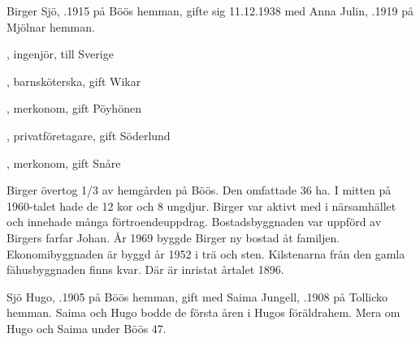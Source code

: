 Birger Sjö, .1915 på Böös hemman, gifte sig 11.12.1938 med Anna Julin, .1919 på Mjölnar hemman.
\begin{jhchildren}
  \item {}, ingenjör, till Sverige
  \item {}, barnsköterska, gift Wikar
  \item {}, merkonom, gift Pöyhönen
  \item {}, privatföretagare, gift Söderlund
  \item {}, merkonom, gift Snåre
\end{jhchildren}

Birger övertog 1/3 av hemgården på Böös. Den omfattade 36 ha. I mitten på 1960-talet hade de 12 kor och 8 ungdjur. Birger var aktivt med i närsamhället och innehade många förtroendeuppdrag. Bostadsbyggnaden var uppförd av Birgers farfar Johan. År 1969 byggde Birger ny bostad åt familjen. Ekonomibyggnaden är byggd år 1952 i trä och sten. Kilstenarna från den gamla fähusbyggnaden finns kvar. Där är inristat årtalet 1896.



Sjö Hugo, .1905 på Böös hemman, gift med Saima Jungell, .1908 på Tollicko hemman. Saima och Hugo bodde de första åren i Hugos föräldrahem. Mera om Hugo och Saima under Böös 47.


